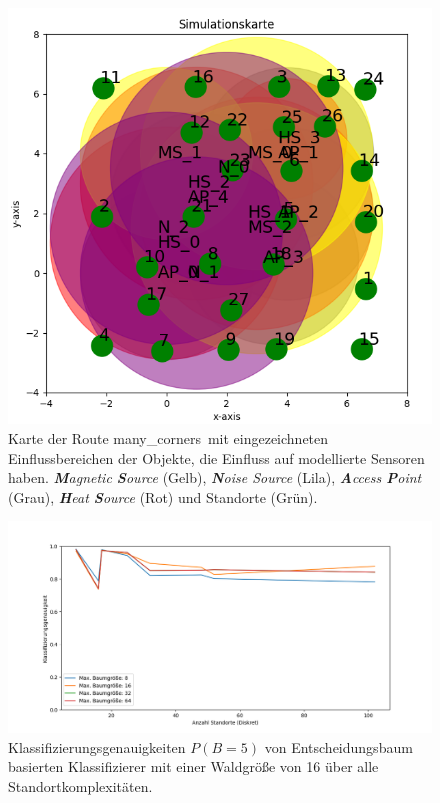 \begin{figure}[h!]
    \centering
    \includegraphics[width=0.9\linewidth]{images/many_corners_simulation_map.png}
    \caption{Karte der Route \glqq many\_corners\grqq\ mit eingezeichneten Einflussbereichen der Objekte, die Einfluss auf modellierte Sensoren haben.
    \textit{\textbf{M}agnetic \textbf{S}ource} (Gelb), \textit{\textbf{N}oise Source} (Lila), \textit{\textbf{A}ccess \textbf{P}oint} (Grau),
    \textit{\textbf{H}eat \textbf{S}ource} (Rot) und Standorte (Grün).}
    \label{fig:many_corners_simulation_map}
\end{figure}

\begin{figure}[h!]
    \centering
    \includegraphics[width=\linewidth]{images/multiple_best_by_group_dt_max_depth_acc_5_cont.png}
    \caption{Klassifizierungsgenauigkeiten $P(B=5)$ von Entscheidungsbaum basierten Klassifizierer mit einer Waldgröße von 16 über alle Standortkomplexitäten.}
    \label{fig:multiple_best_by_group_dt_max_depth_acc_5_cont}
\end{figure}

